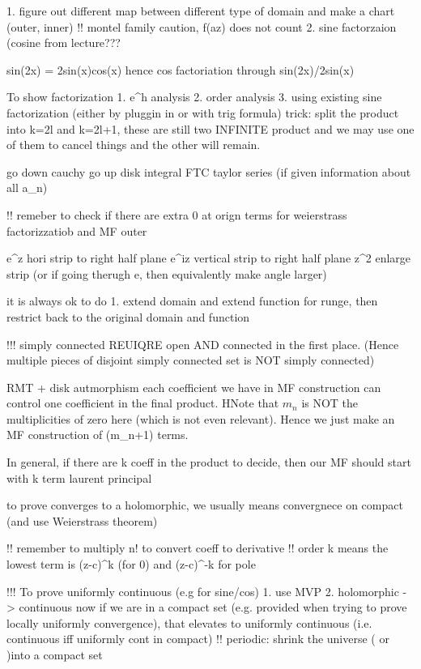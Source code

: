 {{1. figure out different map between different type of domain and make a chart (outer, inner)
!! montel family caution, f(az) does not count
2. sine factorzaion (cosine from lecture???

sin(2x) = 2sin(x)cos(x)
hence cos factoriation through sin(2x)/2sin(x)

To show factorization
1. e^h analysis
2. order analysis
3. using existing sine factorization (either by pluggin in or with trig formula)
	trick: split the product into k=2l and k=2l+1, these are still two INFINITE product and we may use one of them to cancel things and the other will remain.



go down
	cauchy
go up
	disk integral
	FTC
	taylor series (if given information about all a_n)


!! remeber to check if there are extra 0 at orign terms for weierstrass factorizzatiob and MF
		outer

e^z		hori strip to right half plane
e^{iz}	vertical strip to right half plane
z^2		enlarge strip (or if going therugh e, then equivalently make angle larger)
		
it is always ok to do
1. extend domain and extend function for runge, then restrict back to the original domain and function


!!! simply connected REUIQRE open AND connected in the first place. (Hence multiple pieces of disjoint simply connected set is NOT simply connected)

RMT + disk autmorphism
each coefficient we have in MF construction can control one coefficient in the final product. HNote that $m_n$ is NOT the multiplicities of zero here (which is not even relevant). Hence we just make an MF construction of (m_n+1) terms.

In general, if there are k coeff in the product to decide, then our MF should start with k term laurent principal

to prove converges to a holomorphic, we usually means convergnece on compact (and use Weierstrass theorem)

!! remember to multiply n! to convert coeff to derivative
!! order k means the lowest term is (z-c)^k (for 0) and (z-c)^{-k} for pole

!!! To prove uniformly continuous (e.g for sine/cos)
	1. use MVP
	2. holomorphic -> continuous 
		now if we are in  a compact set (e.g. provided when trying to prove locally uniformly convergence), that elevates to uniformly continuous (i.e. continuous iff uniformly cont in compact)
		!! periodic: shrink the universe ( or )into a compact set
		 
}}
